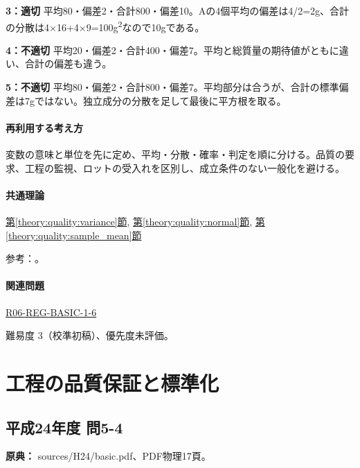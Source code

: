 \noindent\textbf{3：適切} 平均80・偏差2・合計800・偏差10。Aの4個平均の偏差は4/2=\allowbreak{}2g、合計の分散は4×16+4×9=\allowbreak{}100g\textsuperscript{2}なので10gである。\par

\noindent\textbf{4：不適切} 平均20・偏差2・合計400・偏差7。平均と総質量の期待値がともに違い、合計の偏差も違う。\par

\noindent\textbf{5：不適切} 平均80・偏差2・合計800・偏差7。平均部分は合うが、合計の標準偏差は7gではない。独立成分の分散を足して最後に平方根を取る。\par

\paragraph{再利用する考え方} 変数の意味と単位を先に定め、平均・分散・確率・判定を順に分ける。品質の要求、工程の監視、ロットの受入れを区別し、成立条件のない一般化を避ける。

\paragraph{共通理論} \hyperref[theory:quality:variance]{第\ref*{theory:quality:variance}節}, \hyperref[theory:quality:normal]{第\ref*{theory:quality:normal}節}, \hyperref[theory:quality:sample_mean]{第\ref*{theory:quality:sample_mean}節}

\par 参考：\cite{stat_nist_normal,stat_psu_linear}。

\paragraph{関連問題} \hyperref[q:r06-reg-basic-1-6]{R06-REG-BASIC-1-6}

\par 難易度 3（校準初稿）、優先度未評価。

\section{工程の品質保証と標準化}

\subsection{平成24年度 問5-4}
\label{q:h24-reg-basic-5-4}

\noindent\textbf{原典：} sources/H24/basic.pdf、PDF物理17頁。

